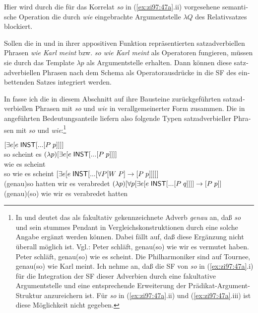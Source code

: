 \documentclass[output=paper, colorlinks, citecolor=brown, booklanguage=german]{langscibook}
\begin{document}
\begin{otherlanguage}{german}
\noindent Hier wird durch die für das Korrelat \textit{so} in (\ref{ex:zi97:47a}.ii) vorgesehene semantische Operation die durch \textit{wie} eingebrachte Argumentstelle $\lambda Q$ des Relativsatzes blockiert.

Sollen die in  und  in ihrer appositiven Funktion repräsentierten satzadverbiellen Phrasen \textit{wie Karl meint} bzw. \textit{so wie Karl meint} als Operatoren fungieren, müssen sie durch das Template  $\lambda p$ als Argumentstelle erhalten. Dann können diese satzadverbiellen Phrasen nach dem Schema  als Operatorausdrücke in die SF des einbettenden Satzes integriert werden.

In  fasse ich die in diesem Abschnitt auf ihre Bausteine zurückgeführten satzadverbiellen Phrasen mit \textit{so} und \textit{wie} in verallgemeinerter Form zusammen. Die in  angeführten Bedeutungsanteile liefern also folgende Typen satzadverbieller Phrasen mit \textit{so} und \textit{wie}:\footnote{In  und  deutet das als fakultativ gekennzeichnete Adverb \textit{genau} an, daß \textit{so} und sein stummes Pendant in Vergleichskonstruktionen durch eine solche Angabe ergänzt werden können. Dabei fällt auf, daß diese Ergänzung nicht überall möglich ist. Vgl.: 
\ea Peter schläft, genau(so) wie wir es vermutet haben.
\ex *Peter schläft, genau(so) wie es scheint.
\ex *Die Philharmoniker sind auf Tournee, genau(so) wie Karl meint.
\z
Ich nehme an, daß die SF von \textit{so} in (\ref{ex:zi97:47a}.i) für die Integration der SF dieser Adverbien durch eine fakultative Argumentstelle und eine entsprechende Erweiterung der Prädikat-Argument-Struktur anzureichern ist. Für \textit{so} in (\ref{ex:zi97:47a}.ii) und (\ref{ex:zi97:47a}.iii) ist diese Möglichkeit nicht gegeben.}

\ea \label{ex:zi97:54}
    \ea \label{ex:zi97:54a} $[\exists e [e \; \cnst{inst} [... [P \; p]]]]$ \\
    so scheint es
    \ex \label{ex:zi97:54b} $(\lambda p)[\exists e [e \; \cnst{inst} [... [P \; p]]]]$ \\
    wie es scheint \\ 
    so wie es scheint
    \ex \label{ex:zi97:54c} $[\exists e [e \; \cnst{inst} [... [\forall P [W \; P] \rightarrow [P \; p ]]]]]$ \\
    (genau)so hatten wir es verabredet
    \ex \label{ex:zi97:54d} $(\lambda p) [\forall p [\exists e [e \; \cnst{inst} [... [P \; q]]]] \rightarrow [P \; p]]$ \\
    (genau)(so) wie wir es verabredet hatten
    \z
\z


\end{otherlanguage}
\end{document}
